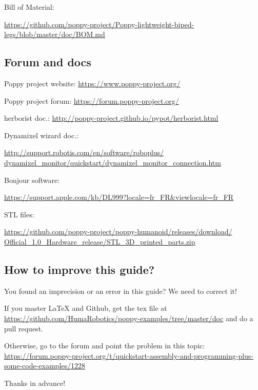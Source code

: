 \documentclass[includefoot]{article}
\begin{document}
Bill of Material:

\begin{flushright}
\href{https://github.com/poppy-project/Poppy-lightweight-biped-legs/blob/master/doc/BOM.md}{https://github.com/poppy-project/Poppy-lightweight-biped-legs/blob/master/doc/BOM.md}
\end{flushright}

\subsection{Forum and docs}

Poppy project website: \hfill \url{https://www.poppy-project.org/} 

Poppy project forum: \hfill \url{https://forum.poppy-project.org/} 

herborist doc.: \hfill
\href{http://poppy-project.github.io/pypot/herborist.html}{http://poppy-project.github.io/pypot/herborist.html}

Dynamixel wizard doc.:

\begin{flushright}
\href{http://support.robotis.com/en/software/roboplus/dynamixel_monitor/quickstart/dynamixel_monitor_connection.htm}{http://support.robotis.com/en/software/roboplus/ dynamixel\_monitor/quickstart/dynamixel\_monitor\_connection.htm}
\end{flushright}

Bonjour software:

\begin{flushright}
\href{https://support.apple.com/kb/DL999?locale=fr_FR&viewlocale=fr_FR}{https://support.apple.com/kb/DL999?locale=fr\_FR\&viewlocale=fr\_FR}
\end{flushright}

STL files:

\begin{flushright}
\href{https://github.com/poppy-project/poppy-humanoid/releases/download/Official_1.0_Hardware_release/STL_3D_printed_parts.zip}{https://github.com/poppy-project/poppy-humanoid/releases/download/ Official\_1.0\_Hardware\_release/STL\_3D\_printed\_parts.zip}
\end{flushright}

\subsection{How to improve this guide?}

You found an imprecision or an error in this guide? We need to correct it!

If you master LaTeX and Github, get the tex file at \href{https://github.com/HumaRobotics/poppy-examples/tree/master/doc}{https://github.com/HumaRobotics/poppy-examples/tree/master/doc} and do a pull request.

Otherwise, go to the forum and point the problem in this topic: \href{https://forum.poppy-project.org/t/quickstart-assembly-and-programming-plus-some-code-examples/1228}{https://forum.poppy-project.org/t/quickstart-assembly-and-programming-plus-some-code-examples/1228}

Thanks in advance!
\end{document}
